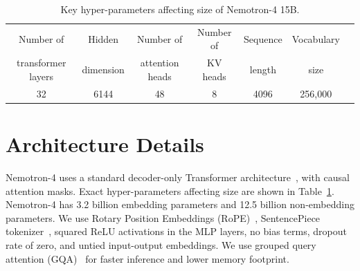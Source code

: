 \documentclass[11pt]{article}
\newcommand{\ours}{Nemotron-4}
\begin{document}

\begin{table}[h]
    \centering
    \begin{tabular}{ccccccc}
    \toprule
    Number of          & Hidden    & Number of       & Number of & Sequence & Vocabulary \\
    transformer layers & dimension & attention heads &    KV heads                & length   & size \\
    \toprule
    32 & 6144 & 48 & 8 & 4096 & 256,000 \\
    \bottomrule
    \end{tabular}
    \caption{Key hyper-parameters affecting size of \ours{} 15B.}
    \label{tab:model_arch}
\end{table}

\section{Architecture Details}


\ours{} uses a standard decoder-only Transformer architecture~\citep{DBLP:journals/corr/VaswaniSPUJGKP17}, with causal attention masks. Exact hyper-parameters affecting size are shown in Table~\ref{tab:model_arch}. 
\ours{} has 3.2 billion embedding parameters and 12.5 billion non-embedding parameters.
We use Rotary Position Embeddings (RoPE)~\citep{su2021roformer}, SentencePiece tokenizer~\citep{kudo2018sentencepiece}, squared ReLU activations in the MLP layers, no bias terms, dropout rate of zero, and untied input-output embeddings.
We use grouped query attention (GQA)~\citep{ainslie2023gqa} for faster inference and lower memory footprint.
\end{document}
